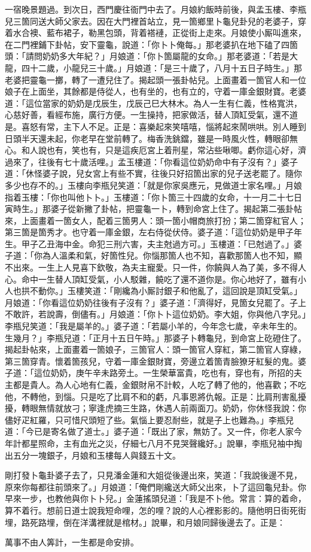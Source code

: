 一宿晚景題過。到次日，西門慶往衙門中去了。月娘約飯時前後，與孟玉樓、李瓶兒三箇同送大師父家去。因在大門裡首站立，見一箇鄉里卜龜兒卦兒的老婆子，穿着水合襖、藍布裙子，勒黑包頭，背着褡褳，正從街上走來。月娘使小厮叫進來，在二門裡鋪下卦帖，安下靈龜，說道：「你卜卜俺每。」那老婆扒在地下磕了四箇頭：「請問奶奶多大年紀？」月娘道：「你卜箇屬龍的女命。」那老婆道：「若是大龍，四十二歲，小龍兒三十歲。」月娘道：「是三十歲了，八月十五日子時生。」那老婆把靈龜一擲，轉了一遭兒住了。揭起頭一張卦帖兒。上面畫着一箇官人和一位娘子在上面坐，其餘都是侍從人，也有坐的，也有立的，守着一庫金銀財寶。老婆道：「這位當家的奶奶是戊辰生，戊辰己巳大林木。為人一生有仁義，性格寬洪，心慈好善，看經布施，廣行方便。一生操持，把家做活，替人頂缸受氣，還不道是。喜怒有常，主下人不足。正是：喜樂起來笑嘻嘻，惱將起來鬧哄哄。別人睡到日頭半天還未起，你老早在堂前轉了。梅香洗銚鐺，雖是一時風火性，轉眼卻無心。和人說也有，笑也有，只是這疾厄宮上着刑星，常沾些啾唧。虧你這心好，濟過來了，往後有七十歲活哩。」孟玉樓道：「你看這位奶奶命中有子沒有？」婆子道：「休怪婆子說，兒女宮上有些不實，往後只好招箇出家的兒子送老罷了。隨你多少也存不的。」玉樓向李瓶兒笑道：「就是你家吳應元，見做道士家名哩。」月娘指着玉樓：「你也叫他卜卜。」玉樓道：「你卜箇三十四歲的女命，十一月二十七日寅時生。」那婆子從新撇了卦帖，把靈龜一卜，轉到命宮上住了。揭起第二張卦帖來，上面畫着一箇女人，配着三箇男人：頭一箇小帽商旅打扮；第二箇穿紅官人；第三箇是箇秀才。也守着一庫金銀，左右侍從伏侍。婆子道：「這位奶奶是甲子年生。甲子乙丑海中金。命犯三刑六害，夫主尅過方可。」玉樓道：「已尅過了。」婆子道：「你為人溫柔和氣，好箇性兒。你惱那箇人也不知，喜歡那箇人也不知，顯不出來。一生上人見喜下欽敬，為夫主寵愛。只一件，你饒與人為了美，多不得人心。命中一生替人頂缸受氣，小人駁雜，饒吃了還不道你是。你心地好了，雖有小人也拱不動你。」玉樓笑道：「剛纔為小厮討銀子和他亂了，這回說是頂缸受氣。」月娘道：「你看這位奶奶往後有子沒有？」婆子道：「濟得好，見箇女兒罷了。子上不敢許，若說壽，倒儘有。」月娘道：「你卜卜這位奶奶。李大姐，你與他八字兒。」李瓶兒笑道：「我是屬羊的。」婆子道：「若屬小羊的，今年念七歲，辛未年生的。生幾月？」李瓶兒道：「正月十五日午時。」那婆子卜轉龜兒，到命宮上矻磴住了。揭起卦帖來，上面畫着一箇娘子，三箇官人：頭一箇官人穿紅，第二箇官人穿綠，第三箇穿青。懷着箇孩兒，守着一庫金銀財寶，旁邊立着箇青臉獠牙紅髮的鬼。{}婆子道：「這位奶奶，庚午辛未路旁土。一生榮華富貴，吃也有，穿也有，所招的夫主都是貴人。為人心地有仁義，金銀財帛不計較，人吃了轉了他的，他喜歡；不吃他，不轉他，到惱。只是吃了比肩不和的虧，凡事恩將仇報。正是：比肩刑害亂擾擾，轉眼無情就放刁；寧逢虎摘三生路，休遇人前兩面刀。奶奶，你休怪我說：你儘好疋紅羅，只可惜尺頭短了些。氣惱上要忍耐些，就是子上也難為。」李瓶兒道：「今已是寄名做了道士。」婆子道：「既出了家，無妨了。又一件，你老人家今年計都星照命，主有血光之災，仔細七八月不見哭聲纔好。」說畢，李瓶兒袖中掏出五分一塊銀子，月娘和玉樓每人與錢五十文。

剛打發卜龜卦婆子去了，只見潘金蓮和大姐從後邊出來，笑道：「我說後邊不見，原來你每都往前頭來了。」月娘道：「俺們剛纔送大師父出來，卜了這回龜兒卦。你早來一步，也教他與你卜卜兒。」金蓮搖頭兒道：「我是不卜他。常言：算的着命，算不着行。想前日道士說我短命哩，怎的哩？說的人心裡影影的。隨他明日街死街埋，路死路埋，倒在洋溝裡就是棺材。」說畢，和月娘同歸後邊去了。正是：

\begin{myquote}
萬事不由人筭計，一生都是命安排。
\end{myquote}

